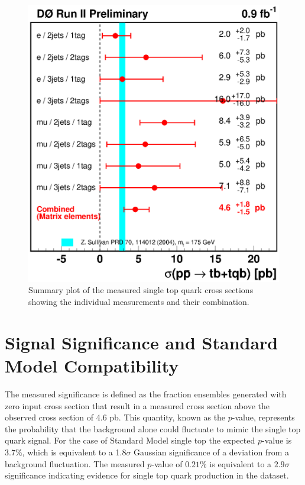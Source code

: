 \begin{figure}[!h!tbp]
\begin{center}
\includegraphics[width=1.00\textwidth]
{eps/MatrixElement/sintop_xsec_summary.eps}
\caption{Summary plot of the measured single top quark cross
sections showing the individual measurements and their combination.}
\label{xsec-summary}
\end{center}
\end{figure}


\section{Signal Significance and Standard Model Compatibility}
\label{significance}

The measured significance is defined as the fraction ensembles generated with zero input cross section that result in a measured cross section above the observed cross section of 4.6 pb. This quantity, known as the $p$-value, represents the probability that the background alone could fluctuate to mimic the single top quark signal. For the case of Standard Model single top the expected $p$-value is 3.7$\%$, which is equivalent to a 1.8$\sigma$ Gaussian significance of a deviation from a background fluctuation. The measured $p$-value of $0.21\%$ is equivalent to a $2.9\sigma$ significance indicating evidence for single top quark production in the dataset.


